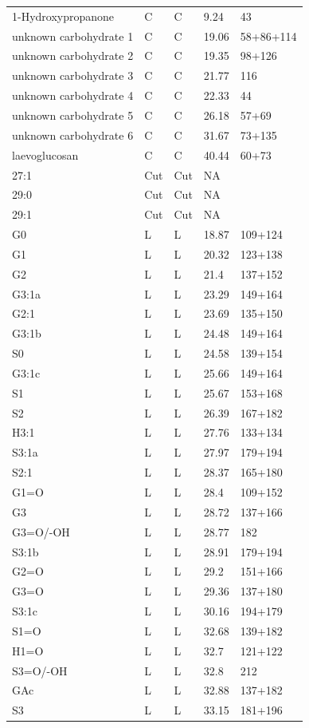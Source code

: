 \documentclass[journal abbreviation]{copernicus}
\begin{document}
\begin{table}[t]
\begin{tabular}{lllll}
1-Hydroxypropanone&C&C&9.24&43\\ 
unknown carbohydrate 1&C&C&19.06&58+86+114\\ 
unknown carbohydrate 2&C&C&19.35&98+126\\ 
unknown carbohydrate 3&C&C&21.77&116\\ 
unknown carbohydrate 4&C&C&22.33&44\\ 
unknown carbohydrate 5&C&C&26.18&57+69\\ 
unknown carbohydrate 6&C&C&31.67&73+135\\ 
laevoglucosan&C&C&40.44&60+73\\ 
27:1&Cut&Cut&NA&\\ 
29:0&Cut&Cut&NA&\\ 
29:1&Cut&Cut&NA&\\ 
G0&L&L&18.87&109+124\\ 
G1&L&L&20.32&123+138\\ 
G2&L&L&21.4&137+152\\ 
G3:1a&L&L&23.29&149+164\\ 
G2:1&L&L&23.69&135+150\\ 
G3:1b&L&L&24.48&149+164\\ 
S0&L&L&24.58&139+154\\ 
G3:1c&L&L&25.66&149+164\\ 
S1&L&L&25.67&153+168\\ 
S2&L&L&26.39&167+182\\ 
H3:1&L&L&27.76&133+134\\ 
S3:1a&L&L&27.97&179+194\\ 
S2:1&L&L&28.37&165+180\\ 
G1=O&L&L&28.4&109+152\\ 
G3&L&L&28.72&137+166\\ 
G3=O/-OH&L&L&28.77&182\\ 
S3:1b&L&L&28.91&179+194\\ 
G2=O&L&L&29.2&151+166\\ 
G3=O&L&L&29.36&137+180\\ 
S3:1c&L&L&30.16&194+179\\ 
S1=O&L&L&32.68&139+182\\ 
H1=O&L&L&32.7&121+122\\ 
S3=O/-OH&L&L&32.8&212\\ 
GAc&L&L&32.88&137+182\\ 
S3&L&L&33.15&181+196\\ 

\end{tabular}
\end{table}
\end{document}
